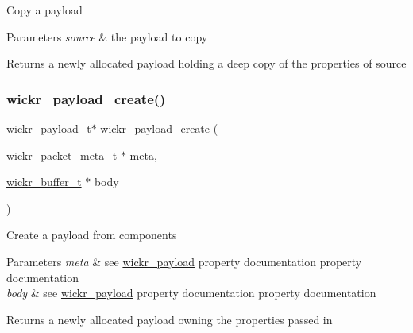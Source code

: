Copy a payload


\begin{DoxyParams}{Parameters}
{\em source} & the payload to copy \\
\hline
\end{DoxyParams}
\begin{DoxyReturn}{Returns}
a newly allocated payload holding a deep copy of the properties of \textquotesingle{}source\textquotesingle{} 
\end{DoxyReturn}
\mbox{\label{group__wickr__protocol_gad7d51d39a8477d87557536ff42399186}} 
\subsubsection{\texorpdfstring{wickr\+\_\+payload\+\_\+create()}{wickr\_payload\_create()}}
{\footnotesize\ttfamily \hyperlink{structwickr__payload}{wickr\+\_\+payload\+\_\+t}$\ast$ wickr\+\_\+payload\+\_\+create (\begin{DoxyParamCaption}\item[{\hyperlink{structwickr__packet__meta}{wickr\+\_\+packet\+\_\+meta\+\_\+t} $\ast$}]{meta,  }\item[{\hyperlink{structwickr__buffer}{wickr\+\_\+buffer\+\_\+t} $\ast$}]{body }\end{DoxyParamCaption})}

Create a payload from components


\begin{DoxyParams}{Parameters}
{\em meta} & see \textquotesingle{}\hyperlink{structwickr__payload}{wickr\+\_\+payload}\textquotesingle{} property documentation property documentation \\
\hline
{\em body} & see \textquotesingle{}\hyperlink{structwickr__payload}{wickr\+\_\+payload}\textquotesingle{} property documentation property documentation \\
\hline
\end{DoxyParams}
\begin{DoxyReturn}{Returns}
a newly allocated payload owning the properties passed in 
\end{DoxyReturn}
\mbox{\label{group__wickr__protocol_gaeeebf95ba580b92254a91009245028ee}} 
